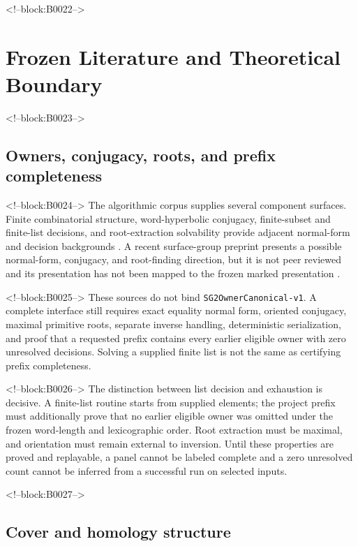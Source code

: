\documentclass[11pt]{article}
\begin{document}
<!--block:B0022-->
\hypertarget{2-frozen-literature-and-theoretical-boundary}{%
\section{Frozen Literature and Theoretical
Boundary}\label{2-frozen-literature-and-theoretical-boundary}}

<!--block:B0023-->
\hypertarget{21-owners-conjugacy-roots-and-prefix-completeness}{%
\subsection{Owners, conjugacy, roots, and prefix
completeness}\label{21-owners-conjugacy-roots-and-prefix-completeness}}

<!--block:B0024-->
The algorithmic corpus supplies several component surfaces. Finite
combinatorial structure, word-hyperbolic conjugacy, finite-subset and
finite-list decisions, and root-extraction solvability provide adjacent
normal-form and decision backgrounds
\citep{P32-S01,P32-S02,P32-S03,P32-S04,P32-S05}.
A recent surface-group preprint presents a possible normal-form,
conjugacy, and root-finding direction, but it is not peer reviewed and
its presentation has not been mapped to the frozen marked presentation
\citep{P32-S06}.

<!--block:B0025-->
These sources do not bind \texttt{SG2OwnerCanonical-v1}. A complete
interface still requires exact equality normal form, oriented conjugacy,
maximal primitive roots, separate inverse handling, deterministic
serialization, and proof that a requested prefix contains every earlier
eligible owner with zero unresolved decisions. Solving a supplied finite
list is not the same as certifying prefix completeness.

<!--block:B0026-->
The distinction between list decision and exhaustion is decisive. A
finite-list routine starts from supplied elements; the project prefix
must additionally prove that no earlier eligible owner was omitted
under the frozen word-length and lexicographic order. Root extraction
must be maximal, and orientation must remain external to inversion.
Until these properties are proved and replayable, a panel cannot be
labeled complete and a zero unresolved count cannot be inferred from a
successful run on selected inputs.

<!--block:B0027-->
\hypertarget{22-cover-and-homology-structure}{%
\subsection{Cover and homology
structure}\label{22-cover-and-homology-structure}}
\end{document}
